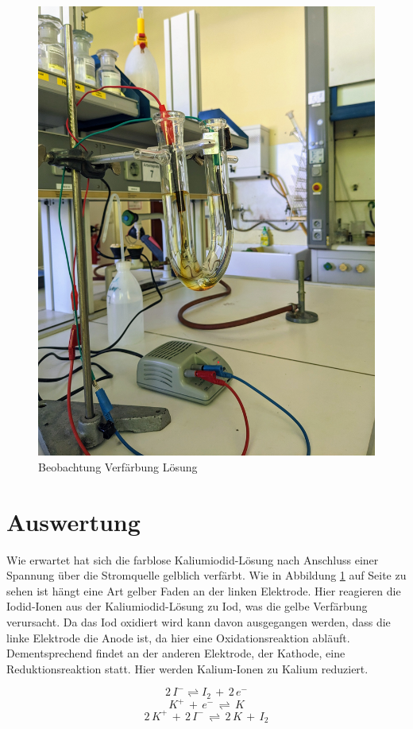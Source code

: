 \documentclass[11pt]{article}
\begin{document}
\begin{figure}[h!]
    \centering
    \caption{Beobachtung Verfärbung Lösung}
    \label{fig:beobachtung}
    \includegraphics[scale=0.06]{beobachtung.jpg}
\end{figure}


\section{Auswertung}
Wie erwartet hat sich die farblose Kaliumiodid-Lösung nach Anschluss einer Spannung über die Stromquelle gelblich verfärbt. Wie in Abbildung \ref{fig:beobachtung} auf Seite \pageref{fig:beobachtung} zu sehen ist hängt eine Art gelber Faden an der linken Elektrode. Hier reagieren die Iodid-Ionen aus der Kaliumiodid-Lösung zu Iod, was die gelbe Verfärbung verursacht. Da das Iod oxidiert wird kann davon ausgegangen werden, dass die linke Elektrode die Anode ist, da hier eine Oxidationsreaktion abläuft. Dementsprechend findet an der anderen Elektrode, der Kathode, eine Reduktionsreaktion statt. Hier werden Kalium-Ionen zu Kalium reduziert.
\begin{center}
    \begin{equation}
        2\,I^{-} \rightleftharpoons I_{2}\,+\,2\,e^{-}
    \end{equation}
    \begin{equation}
        K^{+}\,+\,e^{-}\,\rightleftharpoons\,K
    \end{equation}
    \begin{equation}
        2\,K^{+}\,+\,2\,I^{-}\,\rightleftharpoons\,2\,K\,+\,I_{2}
    \end{equation}
\end{center}
\end{document}
